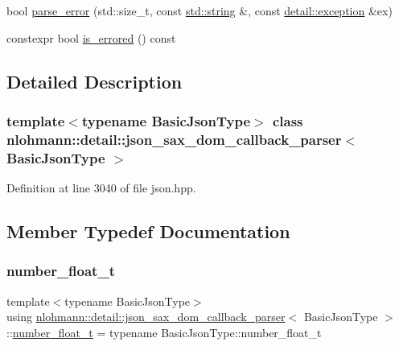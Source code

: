 \begin{DoxyCompactItemize}
\item 
bool \mbox{\hyperlink{classnlohmann_1_1detail_1_1json__sax__dom__callback__parser_aac6e64f0b59c9150cde974e182d5ecab}{parse\+\_\+error}} (std\+::size\+\_\+t, const \mbox{\hyperlink{namespacenlohmann_1_1detail_a1ed8fc6239da25abcaf681d30ace4985ab45cffe084dd3d20d928bee85e7b0f21}{std\+::string}} \&, const \mbox{\hyperlink{classnlohmann_1_1detail_1_1exception}{detail\+::exception}} \&ex)
\item 
constexpr bool \mbox{\hyperlink{classnlohmann_1_1detail_1_1json__sax__dom__callback__parser_a167fd9bf385d3d08bcbbba8a927c0eff}{is\+\_\+errored}} () const
\end{DoxyCompactItemize}


\subsection{Detailed Description}
\subsubsection*{template$<$typename Basic\+Json\+Type$>$\newline
class nlohmann\+::detail\+::json\+\_\+sax\+\_\+dom\+\_\+callback\+\_\+parser$<$ Basic\+Json\+Type $>$}



Definition at line 3040 of file json.\+hpp.



\subsection{Member Typedef Documentation}
\mbox{\label{classnlohmann_1_1detail_1_1json__sax__dom__callback__parser_a914ea0555cea5290449fb791ae41c655}} 
\subsubsection{\texorpdfstring{number\_float\_t}{number\_float\_t}}
{\footnotesize\ttfamily template$<$typename Basic\+Json\+Type$>$ \\
using \mbox{\hyperlink{classnlohmann_1_1detail_1_1json__sax__dom__callback__parser}{nlohmann\+::detail\+::json\+\_\+sax\+\_\+dom\+\_\+callback\+\_\+parser}}$<$ Basic\+Json\+Type $>$\+::\mbox{\hyperlink{classnlohmann_1_1detail_1_1json__sax__dom__callback__parser_a914ea0555cea5290449fb791ae41c655}{number\+\_\+float\+\_\+t}} =  typename Basic\+Json\+Type\+::number\+\_\+float\+\_\+t}



